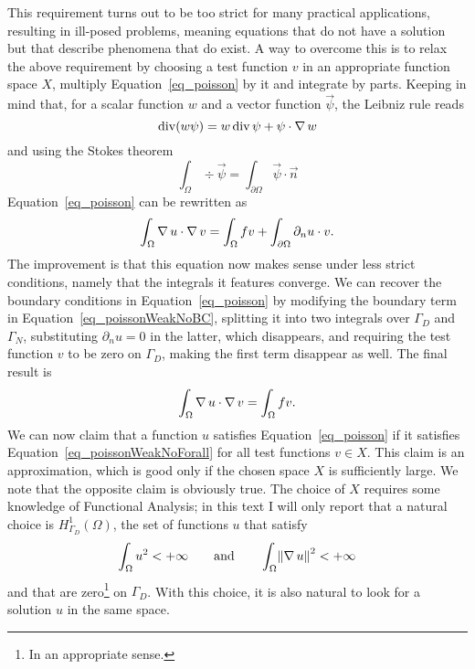 This requirement turns out to be too strict for many practical applications, resulting in ill-posed problems, meaning equations that do not have a solution but that describe phenomena that do exist.
A way to overcome this is to relax the above requirement by choosing a test function \(v\) in an appropriate function space \(X\), multiply Equation~\eqref{eq_poisson} by it and integrate by parts.
Keeping in mind that, for a scalar function \(w\) and a vector function \(\vec{\psi}\), the Leibniz rule reads
\begin{equation}
  \operatorname{div}(w \mathbf{\psi}) = w \operatorname{div} \mathbf{\psi} + \mathbf{\psi} \cdot \operatorname{\nabla} w
  \label{eq_leibniz}
\end{equation}
and using the Stokes theorem
\begin{equation}
  \int_\Omega \div \vec{\psi} = \int_{\partial\Omega} \vec{\psi} \cdot \vec{n}
  \label{eq_stokes}
\end{equation}
Equation~\eqref{eq_poisson} can be rewritten as
\begin{equation}
  \int_\Omega \operatorname{\nabla} u \cdot \operatorname{\nabla} v = \int_\Omega f v + \int_{\partial\Omega} \partial_{n} u \cdot v.
  \label{eq_poissonWeakNoBC}
\end{equation}
The improvement is that this equation now makes sense under less strict
conditions, namely that the integrals it features converge.
We can recover the boundary conditions in Equation~\eqref{eq_poisson} by
modifying the boundary term in Equation~\eqref{eq_poissonWeakNoBC},
splitting it into two integrals over \(\Gamma_D\) and \(\Gamma_N\),
substituting \(\partial_{n} u = 0\) in the latter, which disappears, and requiring the test function \(v\) to
be zero on \(\Gamma_D\), making the first term disappear as well.
The final result is
\begin{equation}
  \int_\Omega \operatorname{\nabla} u \cdot \operatorname{\nabla} v = \int_\Omega f v.
  \label{eq_poissonWeakNoForall}
\end{equation}
We can now claim that a function \(u\) satisfies
Equation~\eqref{eq_poisson} if it satisfies
Equation~\eqref{eq_poissonWeakNoForall} for all test functions \(v \in X\).
This claim is an approximation, which is good only if the chosen space
\(X\) is sufficiently large.
We note that the opposite claim is obviously true.
The choice of \(X\) requires some knowledge of Functional Analysis; in
this text I will only report that a natural choice is
\(H^1_{\Gamma_D}(\Omega)\), the set of functions \(u\) that satisfy
\[
  \int_\Omega u^2 < +\infty \qquad \text{and} \qquad \int_\Omega \norm*{\grad u}^2 < +\infty
\]
and that are zero\footnote{In an appropriate sense.} on \(\Gamma_D\).
With this choice, it is also natural to look for a solution \(u\) in the
same space.

